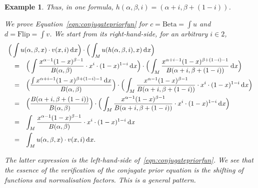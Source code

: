 \documentclass{mscs}
\makeatletter
\newif\ifshowauxproof
\newcommand{\auxprooffont}{\small}
\newcommand{\auxproof}[1]{%
\ifshowauxproof
{\auxprooffont
\textbf{AuxP} #1 \textbf{AuxQ}}%
\else\@bsphack\@esphack\fi}
\newcommand{\after}{\mathrel{\circ}}
\newcommand{\idmap}[1][]{\ensuremath{\mathrm{id}_{#1}}}
\newcommand{\Giry}{\mathcal{G}}
\newcommand{\NNO}{\mathbb{N}}
\newcommand{\tuple}[1]{\langle#1\rangle}
\newcommand{\intd}{{\kern.2em}\mathrm{d}{\kern.03em}}
\newcommand{\betachan}{\ensuremath{\mathrm{Beta}}}
\newcommand{\flipchan}{\ensuremath{\mathrm{Flip}}}
\newtheorem{example}[theorem]{Example}
\makeatother
\begin{document}
\begin{example}
\noindent Thus, in one formula, $h(\alpha,\beta,i) = (\alpha+i,
\beta+(1-i))$.

We prove Equation~\eqref{eqn:conjugatepriorfun} for $c = \betachan =
\int u$ and $d = \flipchan = \int v$. We start from its
right-hand-side, for an arbitrary $i\in 2$,
\[ \begin{array}{rcl}
\lefteqn{\displaystyle \Big(\int u(\alpha,\beta,x)\cdot v(x,i)\intd x\Big) 
   \cdot \Big(\int_{M} u(h(\alpha,\beta,i),x) \intd x\Big)}
\\
& = &
\displaystyle\Big(\int \frac{x^{\alpha-1}(1-x)^{\beta-1}}{B(\alpha,\beta)} \cdot 
      x^{i}\cdot (1-x)^{1-i} \intd x\Big) \cdot
   \Big(\int_{M} \frac{x^{\alpha+i-1}(1-x)^{\beta+(1-i)-1}}
      {B(\alpha+i,\beta+(1-i))} \intd x\Big)
\\[+1em]
& = &
\displaystyle\Big(\frac{\int x^{\alpha+i-1}(1-x)^{\beta+(1-i)-1} \intd x}
      {B(\alpha,\beta)}\Big) \cdot
   \Big(\int_{M} \frac{x^{\alpha-1}(1-x)^{\beta-1}}
      {B(\alpha+i,\beta+(1-i))} \cdot x^{i} \cdot (1-x)^{1-i} \intd x\Big)
\\[+1em]
& = &
\displaystyle\Big(\frac{B(\alpha+i,\beta+(1-i))}{B(\alpha,\beta)}\Big) \cdot
   \Big(\int_{M} \frac{x^{\alpha-1}(1-x)^{\beta-1}}
      {B(\alpha+i,\beta+(1-i))} \cdot x^{i} \cdot (1-x)^{1-i} \intd x\Big)
\\[+1em]
& = &
\displaystyle \int_{M}\frac{x^{\alpha-1}(1-x)^{\beta-1}}{B(\alpha,\beta)} 
   \cdot x^{i} \cdot (1-x)^{1-i} \intd x
\\[+1em]
& = &
\displaystyle \int_{M} u(\alpha,\beta,x)\cdot v(x, i) \intd x.
\end{array} \]

\noindent The latter expression is the left-hand-side
of~\eqref{eqn:conjugatepriorfun}. We see that the essence of the
verification of the conjugate prior equation is the shifting of
functions and normalisation factors.  This is a general pattern.

\auxproof{
We have to prove Equation~\eqref{eqn:conjugateprior}. Its
left-hand-side is, as Kleisli map $\NNO_{>0}\times\NNO_{>0}
\rightarrow \Giry([0,1]\times 2)$, applied to measurable subsets
$M\subseteq [0,1]$ and $N\subseteq 2$,
\[ \begin{array}{rcl}
\big(\tuple{\idmap, \flipchan} \after \betachan\big)(\alpha,\beta)(M\times N)
& = &
\big(\tuple{\idmap, \flipchan} \gg \betachan(\alpha,\beta)\big)(M\times N)
\\
& \smash{\stackrel{\eqref{eqn:pdfgraphstatetransformation}}{=}} &
\displaystyle \int_{M\times N} \frac{x^{\alpha-1}(1-x)^{\beta-1}}
   {B(\alpha,\beta)} \cdot x^{i}\cdot (1-x)^{1-i} \intd (x,i)
\\
& = &
\displaystyle \int_{M\times N} \frac{x^{\alpha-1+i}(1-x)^{\beta-i}}
   {B(\alpha,\beta)} \intd (x,i).
\end{array} \]

}
\end{example}
\end{document}
